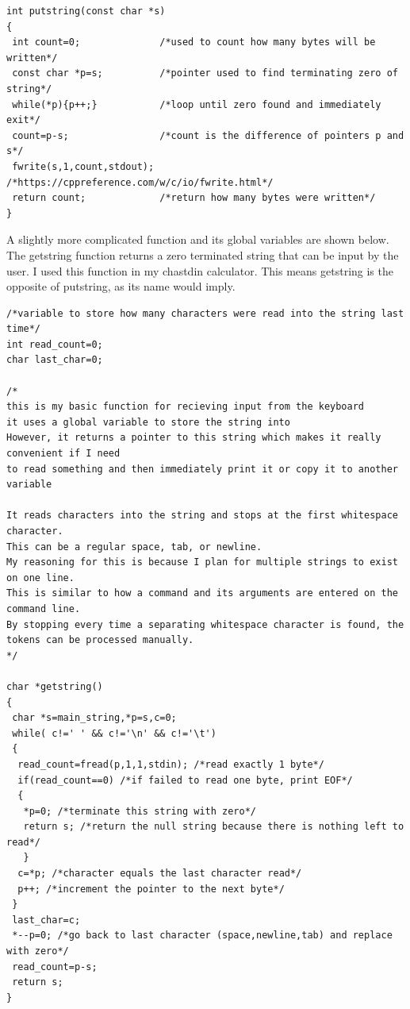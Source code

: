 \documentclass{book}
\begin{document}
\begin{verbatim}
int putstring(const char *s)
{
 int count=0;              /*used to count how many bytes will be written*/
 const char *p=s;          /*pointer used to find terminating zero of string*/
 while(*p){p++;}           /*loop until zero found and immediately exit*/
 count=p-s;                /*count is the difference of pointers p and s*/
 fwrite(s,1,count,stdout); /*https://cppreference.com/w/c/io/fwrite.html*/
 return count;             /*return how many bytes were written*/
}
\end{verbatim}

A slightly more complicated function and its global variables are shown below. The getstring function returns a zero terminated string that can be input by the user. I used this function in my chastdin calculator. This means getstring is the opposite of putstring, as its name would imply.

\begin{verbatim}
/*variable to store how many characters were read into the string last time*/
int read_count=0;
char last_char=0;

/*
this is my basic function for recieving input from the keyboard
it uses a global variable to store the string into
However, it returns a pointer to this string which makes it really convenient if I need
to read something and then immediately print it or copy it to another variable

It reads characters into the string and stops at the first whitespace character.
This can be a regular space, tab, or newline.
My reasoning for this is because I plan for multiple strings to exist on one line.
This is similar to how a command and its arguments are entered on the command line.
By stopping every time a separating whitespace character is found, the tokens can be processed manually.
*/

char *getstring()
{
 char *s=main_string,*p=s,c=0;
 while( c!=' ' && c!='\n' && c!='\t')
 {
  read_count=fread(p,1,1,stdin); /*read exactly 1 byte*/
  if(read_count==0) /*if failed to read one byte, print EOF*/
  {
   *p=0; /*terminate this string with zero*/
   return s; /*return the null string because there is nothing left to read*/
   } 
  c=*p; /*character equals the last character read*/
  p++; /*increment the pointer to the next byte*/
 }
 last_char=c;
 *--p=0; /*go back to last character (space,newline,tab) and replace with zero*/
 read_count=p-s;
 return s;
}
\end{verbatim}
\end{document}
